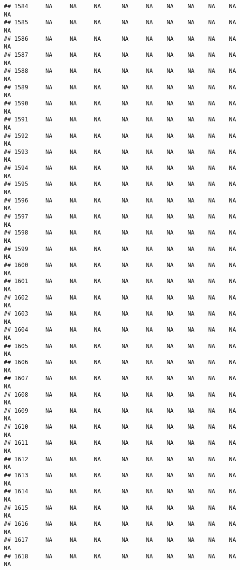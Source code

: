 \documentclass{article}\usepackage{graphicx, color}
\makeatletter
\newenvironment{kframe}{%
 \def\at@end@of@kframe{}%
 \ifinner\ifhmode%
  \def\at@end@of@kframe{\end{minipage}}%
  \begin{minipage}{\columnwidth}%
 \fi\fi%
 \def\FrameCommand##1{\hskip\@totalleftmargin \hskip-\fboxsep
 \colorbox{shadecolor}{##1}\hskip-\fboxsep
     \hskip-\linewidth \hskip-\@totalleftmargin \hskip\columnwidth}%
 \MakeFramed {\advance\hsize-\width
   \@totalleftmargin\z@ \linewidth\hsize
   \@setminipage}}%
 {\par\unskip\endMakeFramed%
 \at@end@of@kframe}
\newenvironment{knitrout}{}{} %
\makeatother
\begin{document}
\begin{knitrout}
\begin{kframe}
\begin{verbatim}
## 1584     NA     NA     NA      NA     NA    NA    NA    NA    NA     NA
## 1585     NA     NA     NA      NA     NA    NA    NA    NA    NA     NA
## 1586     NA     NA     NA      NA     NA    NA    NA    NA    NA     NA
## 1587     NA     NA     NA      NA     NA    NA    NA    NA    NA     NA
## 1588     NA     NA     NA      NA     NA    NA    NA    NA    NA     NA
## 1589     NA     NA     NA      NA     NA    NA    NA    NA    NA     NA
## 1590     NA     NA     NA      NA     NA    NA    NA    NA    NA     NA
## 1591     NA     NA     NA      NA     NA    NA    NA    NA    NA     NA
## 1592     NA     NA     NA      NA     NA    NA    NA    NA    NA     NA
## 1593     NA     NA     NA      NA     NA    NA    NA    NA    NA     NA
## 1594     NA     NA     NA      NA     NA    NA    NA    NA    NA     NA
## 1595     NA     NA     NA      NA     NA    NA    NA    NA    NA     NA
## 1596     NA     NA     NA      NA     NA    NA    NA    NA    NA     NA
## 1597     NA     NA     NA      NA     NA    NA    NA    NA    NA     NA
## 1598     NA     NA     NA      NA     NA    NA    NA    NA    NA     NA
## 1599     NA     NA     NA      NA     NA    NA    NA    NA    NA     NA
## 1600     NA     NA     NA      NA     NA    NA    NA    NA    NA     NA
## 1601     NA     NA     NA      NA     NA    NA    NA    NA    NA     NA
## 1602     NA     NA     NA      NA     NA    NA    NA    NA    NA     NA
## 1603     NA     NA     NA      NA     NA    NA    NA    NA    NA     NA
## 1604     NA     NA     NA      NA     NA    NA    NA    NA    NA     NA
## 1605     NA     NA     NA      NA     NA    NA    NA    NA    NA     NA
## 1606     NA     NA     NA      NA     NA    NA    NA    NA    NA     NA
## 1607     NA     NA     NA      NA     NA    NA    NA    NA    NA     NA
## 1608     NA     NA     NA      NA     NA    NA    NA    NA    NA     NA
## 1609     NA     NA     NA      NA     NA    NA    NA    NA    NA     NA
## 1610     NA     NA     NA      NA     NA    NA    NA    NA    NA     NA
## 1611     NA     NA     NA      NA     NA    NA    NA    NA    NA     NA
## 1612     NA     NA     NA      NA     NA    NA    NA    NA    NA     NA
## 1613     NA     NA     NA      NA     NA    NA    NA    NA    NA     NA
## 1614     NA     NA     NA      NA     NA    NA    NA    NA    NA     NA
## 1615     NA     NA     NA      NA     NA    NA    NA    NA    NA     NA
## 1616     NA     NA     NA      NA     NA    NA    NA    NA    NA     NA
## 1617     NA     NA     NA      NA     NA    NA    NA    NA    NA     NA
## 1618     NA     NA     NA      NA     NA    NA    NA    NA    NA     NA

\end{verbatim}
\end{kframe}
\end{knitrout}
\end{document}
